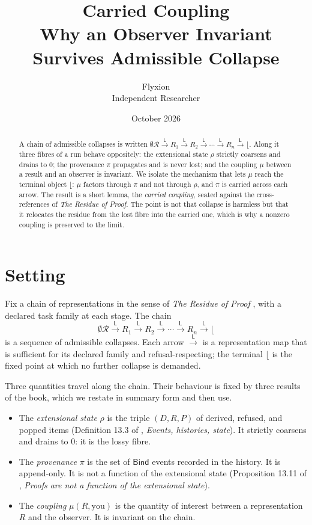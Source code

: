 \documentclass[10pt,a4paper]{article}
\title{\textbf{Carried Coupling}\\[0.4em]
\large Why an Observer Invariant Survives Admissible Collapse}
\author{Flyxion\\
  \small Independent Researcher}
\date{October 2026}
\theoremstyle{plain}
\theoremstyle{definition}
\theoremstyle{remark}
\newcommand{\Lto}{\xrightarrow{\ \mathsf{L}\ }}
\newcommand{\home}{\lfloor}
\newcommand{\Rho}{\rho}
\newcommand{\Pii}{\pi}
\newcommand{\Mu}{\mu}
\newcommand{\Rres}{\mathcal{R}}
\begin{document}
\maketitle

\begin{abstract}
\noindent
A chain of admissible collapses is written
$\emptyset \Rres \Lto R_1 \Lto R_2 \Lto \cdots \Lto R_n \Lto \home$.
Along it three fibres of a run behave oppositely: the extensional state
$\Rho$ strictly coarsens and drains to $0$; the provenance $\Pii$ propagates
and is never lost; and the coupling $\Mu$ between a result and an observer is
invariant. We isolate the mechanism that lets $\Mu$ reach the terminal object
$\home$: $\Mu$ factors through $\Pii$ and not through $\Rho$, and $\Pii$ is
carried across each arrow. The result is a short lemma, the
\emph{carried coupling}, seated against the cross-references of
\emph{The Residue of Proof}. The point is not that collapse is harmless but
that it relocates the residue from the lost fibre into the carried one, which
is why a nonzero coupling is preserved to the limit.
\end{abstract}

\section{Setting}

Fix a chain of representations in the sense of
\emph{The Residue of Proof} \cite{residue}, with a declared task family at each
stage. The chain
\[
\emptyset \Rres \Lto R_1 \Lto R_2 \Lto \cdots \Lto R_n \Lto \home
\]
is a sequence of admissible collapses. Each arrow $\Lto$ is a representation
map that is sufficient for its declared family and refusal-respecting; the
terminal $\home$ is the fixed point at which no further collapse is demanded.

Three quantities travel along the chain. Their behaviour is fixed by three
results of the book, which we restate in summary form and then use.

\begin{itemize}[leftmargin=1.4em,nosep]
\item The \emph{extensional state} $\Rho$ is the triple $(D,R,P)$ of derived,
refused, and popped items (Definition 13.3 of \cite{residue},
\emph{Events, histories, state}). It strictly coarsens and drains to $0$: it is
the lossy fibre.
\item The \emph{provenance} $\Pii$ is the set of $\mathsf{Bind}$ events recorded
in the history. It is append-only. It is not a function of the extensional state
(Proposition 13.11 of \cite{residue}, \emph{Proofs are not a function of the
extensional state}).
\item The \emph{coupling} $\Mu(R, \text{you})$ is the quantity of interest
between a representation $R$ and the observer. It is invariant on the chain.
\end{itemize}
\end{document}
